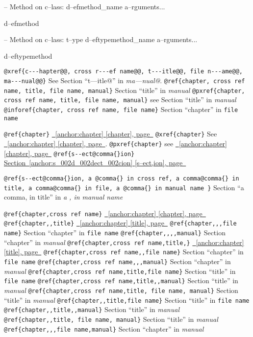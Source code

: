 \documentclass{book}
\begin{document}
\hbox{}-- Method on c--lass: d--efmethod\_name a--rguments...


%
d--efmethod

\hbox{}-- Method on c--lass: t--ype d--eftypemethod\_name a--rguments...


%
d--eftypemethod

\texttt{@xref\{c{-}{-}{-}hapter@@, cross r{-}{-}{-}ef name@@, t{-}{-}{-}itle@@, file n{-}{-}{-}ame@@, ma{-}{-}{-}nual@@\}} See Section ``t---itle@'' in \textit{ma---nual@}.
\texttt{@ref\{chapter, cross ref name, title, file name, manual\}} Section ``title'' in \textit{manual}
\texttt{@pxref\{chapter, cross ref name, title, file name, manual\}} see Section ``title'' in \textit{manual}
\texttt{@inforef\{chapter, cross ref name, file name\}} Section ``chapter'' in \texttt{file name}

\texttt{@ref\{chapter\}} \hyperref[anchor:chapter]{\chaptername~\ref*{anchor:chapter} [chapter], page~\pageref*{anchor:chapter}}
\texttt{@xref\{chapter\}} See \hyperref[anchor:chapter]{\chaptername~\ref*{anchor:chapter} [chapter], page~\pageref*{anchor:chapter}}.
\texttt{@pxref\{chapter\}} see \hyperref[anchor:chapter]{\chaptername~\ref*{anchor:chapter} [chapter], page~\pageref*{anchor:chapter}}
\texttt{@ref\{s{-}{-}ect@comma\{\}ion\}} \hyperref[anchor:s_002d_002dect_002cion]{Section~\ref*{anchor:s_002d_002dect_002cion} [s--ect,ion], page~\pageref*{anchor:s_002d_002dect_002cion}}

\texttt{@ref\{s{-}{-}ect@comma\{\}ion, a @comma\{\} in cross
ref, a comma@comma\{\} in title, a comma@comma\{\} in file, a @comma\{\} in manual name \}}
Section ``a comma, in title'' in \textit{a , in manual name}

\texttt{@ref\{chapter,cross ref name\}} \hyperref[anchor:chapter]{\chaptername~\ref*{anchor:chapter} [chapter], page~\pageref*{anchor:chapter}}
\texttt{@ref\{chapter,,title\}} \hyperref[anchor:chapter]{\chaptername~\ref*{anchor:chapter} [title], page~\pageref*{anchor:chapter}}
\texttt{@ref\{chapter,,,file name\}} Section ``chapter'' in \texttt{file name}
\texttt{@ref\{chapter,,,,manual\}} Section ``chapter'' in \textit{manual}
\texttt{@ref\{chapter,cross ref name,title,\}} \hyperref[anchor:chapter]{\chaptername~\ref*{anchor:chapter} [title], page~\pageref*{anchor:chapter}}
\texttt{@ref\{chapter,cross ref name,,file name\}} Section ``chapter'' in \texttt{file name}
\texttt{@ref\{chapter,cross ref name,,,manual\}} Section ``chapter'' in \textit{manual}
\texttt{@ref\{chapter,cross ref name,title,file name\}} Section ``title'' in \texttt{file name}
\texttt{@ref\{chapter,cross ref name,title,,manual\}} Section ``title'' in \textit{manual}
\texttt{@ref\{chapter,cross ref name,title, file name, manual\}} Section ``title'' in \textit{manual}
\texttt{@ref\{chapter,,title,file name\}} Section ``title'' in \texttt{file name}
\texttt{@ref\{chapter,,title,,manual\}} Section ``title'' in \textit{manual}
\texttt{@ref\{chapter,,title, file name, manual\}} Section ``title'' in \textit{manual}
\texttt{@ref\{chapter,,,file name,manual\}} Section ``chapter'' in \textit{manual}
\end{document}
